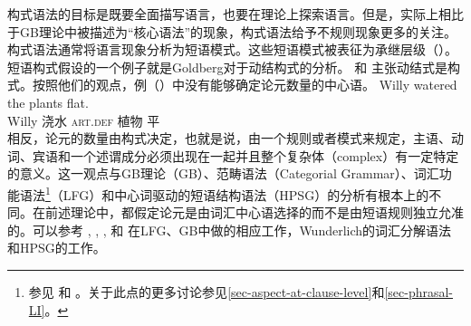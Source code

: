 \noindent
构式语法的目标是既要全面描写语言，也要在理论上探索语言。但是，实际上相比于GB理论中被描述为“核心语法”的现象，构式语法给予不规则现象更多的关注。构式语法通常将语言现象分析为短语模式。这些短语模式被表征为承继层级（\egc \citealp{Croft2001a,Goldberg2003a}）。短语构式假设的一个例子就是Goldberg对于动结构式的分析。 \citet{Goldberg95a}和 \citet{GJ2004a}主张动结式是构式。按照他们的观点，例（）中没有能够确定论元数量的中心语。
%
\ea
\gll Willy watered the plants flat.\\
	 Willy 浇水 \textsc{art}.\textsc{def} 植物 平\\
\z
相反，论元的数量由构式决定，也就是说，由一个规则或者模式来规定，主语、动词、宾语和一个述谓成分必须出现在一起并且整个复杂体（complex）有一定特定的意义。这一观点与GB理论\indexgb（GB）、范畴语法\indexcg（Categorial Grammar）、词汇功能语法\footnote{参见 和 。关于此点的更多讨论参见\ref{sec-aspect-at-clause-level}和\ref{sec-phrasal-LI}。%
}\indexlfg（LFG）和中心词驱动的短语结构语法\indexhpsg（HPSG）的分析有根本上的不同。在前述理论中，都假定论元是由词汇中心语选择的而不是由短语规则独立允准的。可以参考 ,  ,  ,  和 在LFG、GB中做的相应工作，Wunderlich的词汇分解语法和HPSG的工作。

